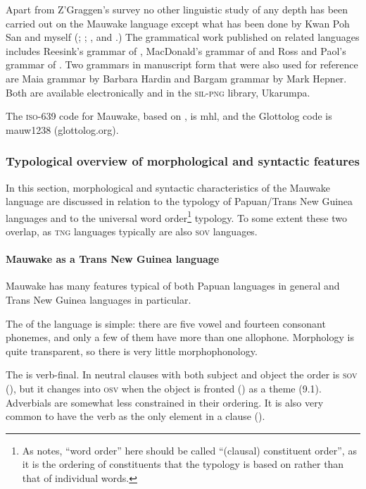 Apart from Z'Graggen's survey no other linguistic study of any depth has been carried out on the Mauwake language except what has been done by Kwan Poh San and myself (\citealt{Kwan1980, Kwan1983, Kwan1988, Kwan1989, Kwan2002}; \citealt{Jarvinen1980,Jarvinen1988a,Jarvinen1988b,Jarvinen1989,Jarvinen1990,Jarvinen1991}; \citealt{JarvinenEtAl2001}, and \citealt{Berghall2006}.)  The grammatical work published on related languages includes Reesink's grammar of \citet{Usan1987}, MacDonald's grammar of \citet{Tauya1990} and Ross and Paol's grammar of \citet{Waskia1978}. Two grammars in manuscript form that were also used for reference are Maia grammar by Barbara Hardin and Bargam grammar by Mark Hepner. Both are available electronically and in the \textsc{sil-png} library, Ukarumpa.

The \textsc{iso}-639 code for Mauwake, based on \citet{Grimes2000}, is mhl, and the Glottolog code is mauw1238 (glottolog.org).

\subsubsection{Typological overview of morphological and syntactic features}
In this section, morphological and syntactic characteristics of the Mauwake language are discussed in relation to the typology of Papuan/Trans New Guinea languages and to the universal word order\footnote{As \citet[72]{Dixon2009} notes, ``word order'' here should be called ``(clausal) constituent order'', as it is the ordering of constituents that the typology is based on rather than that of individual words.}  typology.  To some extent these two overlap, as \textsc{tng} languages typically are also \textsc{sov} languages.

\paragraph[Mauwake as a Trans New Guinea language]{Mauwake as a Trans New Guinea language}
Mauwake has many features typical of both Papuan languages in general and Trans New Guinea languages in particular. 

The  of the language is simple: there are five vowel and fourteen consonant phonemes, and only a few of them have more than one allophone.  Morphology is quite transparent, so there is very little morphophonology.

The  is verb-final. In neutral clauses with both subject and object the order is \textsc{sov} (), but it changes into \textsc{osv} when the object is fronted () as a theme (9.1).  Adverbials are somewhat less constrained in their ordering. It is also very common to have the verb as the only element in a clause (). 

